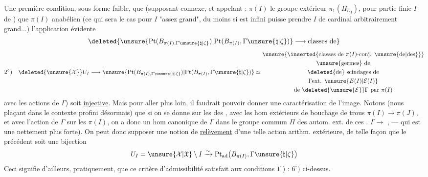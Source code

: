 Une première condition, sous forme faible,  que (supposant  connexe, et appelant : $\pi(I)$ le groupe extérieur $\pi_1(\Pi_{U_I})$, pour  partie finie $I$ de ) que  $\pi(I)$ anabélien (ce qui sera le cas pour $I$ "assez grand",
du moins si  est infini   puisse prendre $I$ de cardinal arbitrairement grand...)  l'application évidente
\[
\deleted{\unsure{\mathrm{Pt}(B_{\pi(I),\Gamma\unsure{\natural|\zeta}})|\mathrm{Pt}(B_{\pi(I)},\Gamma\unsure{\natural|\zeta})}\longrightarrow\text{classes de}}
\]
\[
2^\circ)\quad
\deleted{\unsure{\mathcal X}}U_I\longrightarrow
\unsure{\mathrm{Pt}(B_{\pi(I),\Gamma\unsure{\natural|\zeta}})|\mathrm{Pt}(B_{\pi(I)},\Gamma\unsure{\natural|\zeta})}
\simeq
\begin{gathered}
\unsure{\inserted{\text{classes de }\pi(I)\text{-conj. }\unsure{\text{de}|\text{des}}}}\\
\unsure{\text{germes}}\text{ de}\\
\deleted{\text{de}}\text{ scindages de}\\
\text{l'ext. }\unsure{E(I)|\mathcal E(I)}\\
\text{de }\deleted{\unsure{\mathcal E}}\Gamma\text{ par }\pi(I)
\end{gathered}
\]
 avec les actions de $\Gamma$) soit \uline{injective}. Mais pour aller plus loin, il faudrait pouvoir donner une caractérisation de l'image. Notons (nous plaçant dans le contexte profini désormais) que si on se donne sur les  des ,  avec les hom extérieurs de bouchage de trous $\pi(I)\longrightarrow\pi(J)$, et avec l'action de $\Gamma$ sur les $\pi(I)$, on a donc un
hom canonique de $\Gamma$ dans le groupe commun  $\Pi$ des autom.  ext. de ces .
 \unsure{$=$|$\simeq$} $\Gamma\longrightarrow$ , --- qui est  une  nettement plus forte). On peut donc
supposer  une notion de \uline{relèvement}
 d'une telle action arithm.
extérieure, de telle façon que le
 précédent soit une bijection
\[
 U_I=\unsure{\mathcal X|\mathfrak X}\setminus I
 \xrightarrow{\sim}
 \mathrm{Pt}_{\mathrm{ad}}\bigl(B_{\pi(I)},\Gamma\unsure{\natural|\zeta}\bigr)
\]
Ceci signifie d'ailleurs, pratiquement,
que ce critère d'admissibilité satisfait
aux conditions $1^\circ)$ : $6^\circ)$  ci-dessus.

